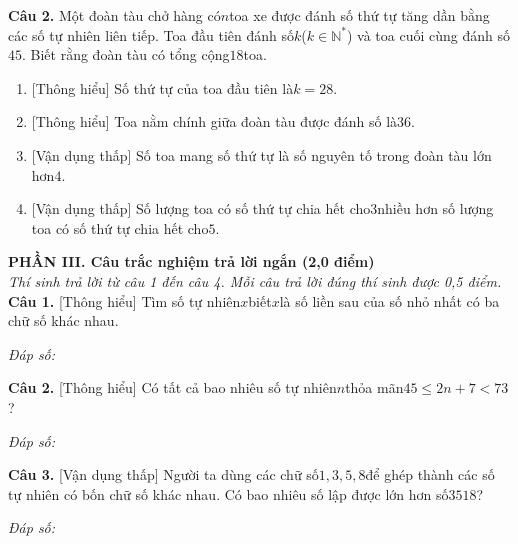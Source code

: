 \documentclass[11pt,a4paper]{article}
\begin{document}
\noindent\textbf{Câu 2.} Một đoàn tàu chở hàng có$n$toa xe được đánh số thứ tự tăng dần bằng các số tự nhiên liên tiếp. Toa đầu tiên đánh số$k$($k \in \mathbb{N}^*$) và toa cuối cùng đánh số$45$. Biết rằng đoàn tàu có tổng cộng$18$toa.\par\vspace{2pt}
\begin{enumerate}[label=\textbf{\alph*)}, leftmargin=1.2cm, itemsep=2pt, topsep=2pt]
  \item \textnormal{[Thông hiểu]} Số thứ tự của toa đầu tiên là$k = 28$.
  \item \textnormal{[Thông hiểu]} Toa nằm chính giữa đoàn tàu được đánh số là$36$.
  \item \textnormal{[Vận dụng thấp]} Số toa mang số thứ tự là số nguyên tố trong đoàn tàu lớn hơn$4$.
  \item \textnormal{[Vận dụng thấp]} Số lượng toa có số thứ tự chia hết cho$3$nhiều hơn số lượng toa có số thứ tự chia hết cho$5$.
\end{enumerate}
\vspace{6pt}


\vspace{6pt}
\noindent
\textbf{\large PHẦN III. Câu trắc nghiệm trả lời ngắn (2,0 điểm)}\\
\textit{\small Thí sinh trả lời từ câu 1 đến câu 4. Mỗi câu trả lời đúng thí sinh được 0,5 điểm.}
\vspace{6pt}
\noindent\textbf{Câu 1.} [Thông hiểu] Tìm số tự nhiên$x$biết$x$là số liền sau của số nhỏ nhất có ba chữ số khác nhau.\par\vspace{2pt}
\noindent\textit{Đáp số:} \dotfill\par\vspace{6pt}

\noindent\textbf{Câu 2.} [Thông hiểu] Có tất cả bao nhiêu số tự nhiên$n$thỏa mãn$45 \le 2n + 7 < 73$?\par\vspace{2pt}
\noindent\textit{Đáp số:} \dotfill\par\vspace{6pt}

\noindent\textbf{Câu 3.} [Vận dụng thấp] Người ta dùng các chữ số$1, 3, 5, 8$để ghép thành các số tự nhiên có bốn chữ số khác nhau. Có bao nhiêu số lập được lớn hơn số$3518$?\par\vspace{2pt}
\noindent\textit{Đáp số:} \dotfill\par\vspace{6pt}
\end{document}
